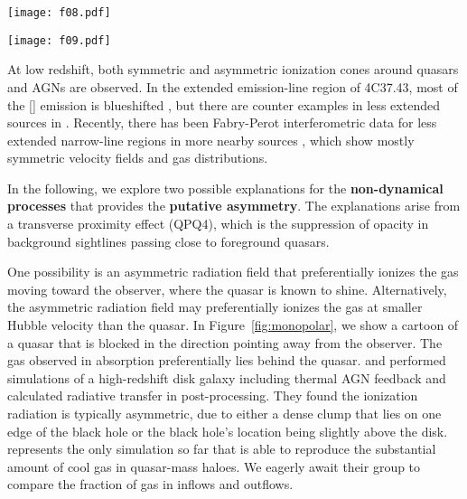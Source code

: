 \documentclass[iop]{emulateapj}
\begin{document}
\begin{SCfigure*}[10][!th]
\texttt{[image: f08.pdf]}
\caption{A cartoon showing a unipolar quasar. The gas observed in low- to intermediate-ion
absorption preferentially lies behind the quasar, and is shadowed from the ionizing radiation.}
\label{fig:monopolar}
\end{SCfigure*}
\begin{SCfigure*}[10][!bh]
\texttt{[image: f09.pdf]}
\caption{A cartoon showing the finite lifetime of quasar episodes as an explanation to the
asymmetric absorption. The setup on the left shows that the foreground quasar has not been shining
long enough for its ionizing radiation to reach the gas behind it, when the light from the
background quasar reaches. The setup on the right shows the scenario after an amount of time
comparable to the light travelling time across CGM scale. Gas in front of the foreground quasar
has been ionized, by the time the light from the background quasar reaches.}
\label{fig:lighttravel}
\end{SCfigure*}

At low redshift, both symmetric and asymmetric ionization cones around quasars and AGNs are
observed. In the extended emission-line region of 4C37.43, most of the [] emission is
blueshifted \citep{FuStockton07}, but there are counter examples in less extended sources in
\cite{FuStockton09}. Recently, there has been Fabry-Perot interferometric data for less extended
narrow-line regions in more nearby sources \citep{Keel+15,Keel+17}, which show mostly symmetric
velocity fields and gas distributions.

In the following, we explore two possible explanations for the {\bf non-dynamical processes} that
provides the {\bf putative asymmetry}.
The explanations arise from a transverse proximity effect (QPQ4), which is the suppression of
opacity in background sightlines passing close to foreground quasars.

One possibility is an asymmetric radiation field that preferentially ionizes the gas moving toward
the observer, where the quasar is known to shine. Alternatively, the asymmetric radiation field
may preferentially ionizes the gas at smaller Hubble velocity than the quasar. In
Figure~\ref{fig:monopolar}, we show a cartoon of a quasar that is blocked in the direction
pointing away from the observer. The gas observed in absorption preferentially lies behind the
quasar.
\cite{Roos+15} and \cite{GaborBournaud14} performed simulations of a high-redshift disk galaxy
including thermal AGN feedback and calculated radiative transfer in post-processing. They found
the ionization radiation is typically asymmetric, due to either a dense clump that lies on one
edge of the black hole or the black hole's location being slightly above the disk.
\cite{FaucherGiguere+16} represents the only simulation so far that is able to reproduce the
substantial amount of cool gas in quasar-mass haloes. We eagerly await their group to compare the
fraction of gas in inflows and outflows.
\end{document}
